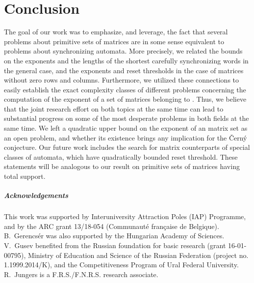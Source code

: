 \documentclass[a4paper,USenglish]{lipics}
\theoremstyle{definition}
\begin{document}
\section{Conclusion}
The goal of our work was to emphasize, and leverage, the fact that several problems about primitive sets of matrices are in some sense equivalent to problems about synchronizing automata. More precisely, we related the bounds on the exponents and the lengths of the shortest carefully synchronizing words in the general case, and the exponents and reset thresholds in the case of matrices without zero rows and columns. Furthermore, we utilized these connections to easily establish the exact complexity classes of different problems concerning the computation of the exponent of a set of matrices belonging to . Thus, we believe that the joint research effort on both topics at the same time can lead to substantial progress on some of the most desperate problems in both fields at the same time. We left a quadratic upper bound on the exponent of an  matrix set as an open problem, and whether its existence brings any implication for the \v{C}ern\'{y} conjecture. Our future work includes the search for matrix counterparts of special classes of automata, which have quadratically bounded reset threshold. These statements will be analogous to our result on primitive sets of matrices having total support.

\subparagraph*{Acknowledgements}
This work was supported by Interuniversity Attraction Poles (IAP) Programme, and by the ARC grant 13/18-054 (Communaut\'e fran\c{c}aise de Belgique). B.~Gerencs\'er was also supported by the Hungarian Academy of Sciences. V.~Gusev benefited from the Russian foundation for basic research (grant 16-01-00795), Ministry of Education and Science of the Russian Federation (project no. 1.1999.2014/K), and the Competitiveness Program of Ural Federal University. R.~Jungers is a F.R.S./F.N.R.S. research associate.


\end{document}

